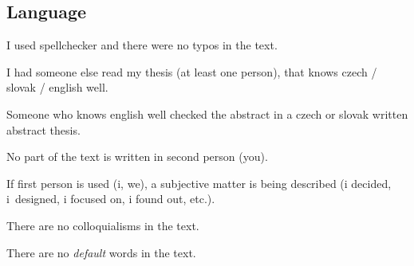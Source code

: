 \subsection*{Language}
\begin{checklist}
	\item I used spellchecker and there were no typos in the text.
    \item I had someone else read my thesis (at least one person), that knows czech / slovak / english well.
    \item Someone who knows english well checked the abstract  in a czech or slovak written abstract thesis.
    \item No part of the text is written in second person (you).
    \item If first person is used (i, we), a subjective matter is being described (i decided, i~designed, i focused on, i found out, etc.).
    \item There are no colloquialisms in the text.
    \item There are no {\it default} words in the text.
\end{checklist}

